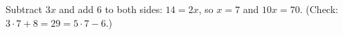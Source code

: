 Subtract $3x$ and add $6$ to both sides: $14=2x$, so $x=7$ and $10x=\boxed{70}$. (Check: $3\cdot7+8=29=5\cdot7-6$.)
